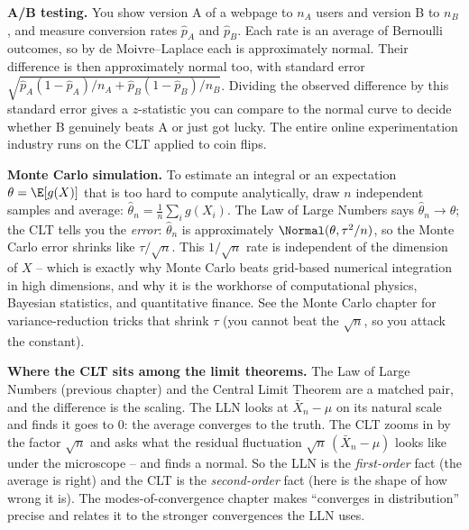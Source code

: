 \begin{applicationbox}
\textbf{A/B testing.} You show version A of a webpage to $n_A$ users and version B to
$n_B$, and measure conversion rates $\hat p_A$ and $\hat p_B$. Each rate is an average
of Bernoulli outcomes, so by de Moivre--Laplace each is approximately normal. Their
difference is then approximately normal too, with standard error
$\sqrt{\hat p_A(1-\hat p_A)/n_A + \hat p_B(1-\hat p_B)/n_B}$. Dividing the observed
difference by this standard error gives a $z$-statistic you can compare to the normal
curve to decide whether B genuinely beats A or just got lucky. The entire online
experimentation industry runs on the CLT applied to coin flips.
\end{applicationbox}

\begin{applicationbox}
\textbf{Monte Carlo simulation.} To estimate an integral or an expectation
$\theta = \E[g(X)]$ that is too hard to compute analytically, draw $n$ independent
samples and average: $\hat\theta_n = \frac1n \sum_i g(X_i)$. The Law of Large Numbers
says $\hat\theta_n \to \theta$; the CLT tells you the \emph{error}: $\hat\theta_n$ is
approximately $\Normal(\theta, \tau^2/n)$, so the Monte Carlo error shrinks like
$\tau/\sqrt n$. This $1/\sqrt n$ rate is independent of the dimension of $X$ -- which is
exactly why Monte Carlo beats grid-based numerical integration in high dimensions, and
why it is the workhorse of computational physics, Bayesian statistics, and quantitative
finance. See the Monte Carlo chapter for variance-reduction tricks that shrink $\tau$
(you cannot beat the $\sqrt n$, so you attack the constant).
\end{applicationbox}

\begin{connectionbox}
\textbf{Where the CLT sits among the limit theorems.} The Law of Large Numbers (previous
chapter) and the Central Limit Theorem are a matched pair, and the difference is the
scaling. The LLN looks at $\bar X_n - \mu$ on its natural scale and finds it goes to
$0$: the average converges to the truth. The CLT zooms in by the factor $\sqrt n$ and
asks what the residual fluctuation $\sqrt n\,(\bar X_n - \mu)$ looks like under the
microscope -- and finds a normal. So the LLN is the \emph{first-order} fact (the average
is right) and the CLT is the \emph{second-order} fact (here is the shape of how wrong it
is). The modes-of-convergence chapter makes ``converges in distribution'' precise and
relates it to the stronger convergences the LLN uses.
\end{connectionbox}


